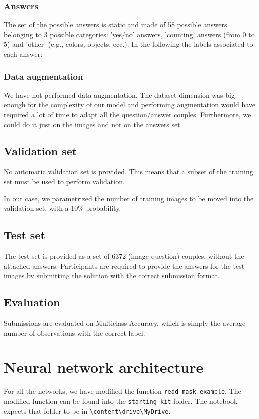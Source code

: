 \documentclass[12pt,a4paper]{report}
\begin{document}
	\subsection{Answers}
The set of the possible answers is static and made of 58 possible answers belonging to 3 possible categories: 'yes/no' answers, 'counting' answers (from 0 to 5) and 'other' (e.g., colors, objects, ecc.). In the following the labels associated to each answer:

	\subsection{Data augmentation}
We have not performed data augmentation. The dataset dimension was big enough for the complexity of our model and performing augmentation would have required a lot of time to adapt all the question/answer couples. Furthermore, we could do it just on the images and not on the answers set.
	\section{Validation set}

No automatic validation set is provided. This means that a subset of the training set must be used to perform validation.

In our case, we parametrized the number of training images to be moved into the validation set, with a 10\% probability.


	\section{Test set}
The test set is provided as a set of 6372 (image-question) couples, without the attached answers. Participants are required to provide the answers for the test images by submitting the solution with the correct submission format.

	\section{Evaluation}
Submissions are evaluated on Multiclass Accuracy, which is simply the average number of observations with the correct label.


	\chapter{Neural network architecture}		
For all the networks, we have modified the function \texttt{read\_mask\_example}. The modified function can be found into the \texttt{starting\_kit} folder. The notebook expects that folder to be in \texttt{\textbackslash content\textbackslash drive\textbackslash MyDrive}.
\end{document}
